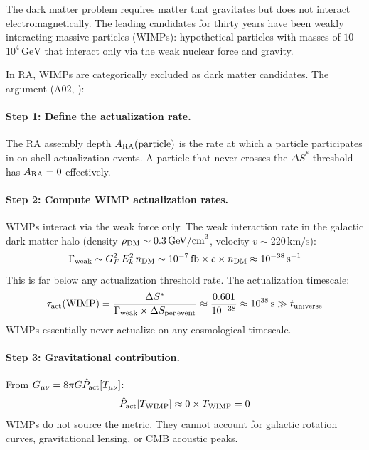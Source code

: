 \documentclass[12pt,a4paper]{article}
\begin{document}
The dark matter problem requires matter that gravitates but does not interact electromagnetically.  The leading candidates for thirty years have been weakly interacting massive particles (WIMPs): hypothetical particles with masses of $10$--$10^4\,\mathrm{GeV}$ that interact only via the weak nuclear force and gravity.

In RA, WIMPs are categorically excluded as dark matter candidates.  The argument (A02, \statusDR):

\paragraph{Step 1: Define the actualization rate.}
The RA assembly depth $A_{\rm RA}(\text{particle})$ is the rate at which a particle participates in on-shell actualization events.  A particle that never crosses the $\Delta S^*$ threshold has $A_{\rm RA}=0$ effectively.

\paragraph{Step 2: Compute WIMP actualization rates.}
WIMPs interact via the weak force only.  The weak interaction rate in the galactic dark matter halo (density $\rho_{\rm DM}\sim0.3\,\mathrm{GeV/cm}^3$, velocity $v\sim220\,\mathrm{km/s}$):
\begin{equation}
  \Gamma_{\rm weak} \sim G_F^2\,E_k^2\,n_{\rm DM} \sim 10^{-7}\,\mathrm{fb}\times c\times n_{\rm DM} \approx 10^{-38}\,\mathrm{s}^{-1}
\end{equation}
This is far below any actualization threshold rate.  The actualization timescale:
\begin{equation}
  \tau_{\rm act}(\text{WIMP}) = \frac{\Delta S^*}{\Gamma_{\rm weak}\times\Delta S_{\rm per\,event}} \approx \frac{0.601}{10^{-38}} \approx 10^{38}\,\mathrm{s} \gg t_{\rm universe}
\end{equation}
WIMPs essentially never actualize on any cosmological timescale.

\paragraph{Step 3: Gravitational contribution.}
From $G_{\mu\nu}=8\pi G\hat{P}_{\mathrm{act}}[T_{\mu\nu}]$:
\begin{equation}
  \hat{P}_{\mathrm{act}}[T_{\rm WIMP}] \approx 0 \times T_{\rm WIMP} = 0
  \label{eq:wimp_prohib}
\end{equation}
WIMPs do not source the metric.  They cannot account for galactic rotation curves, gravitational lensing, or CMB acoustic peaks.
\end{document}
